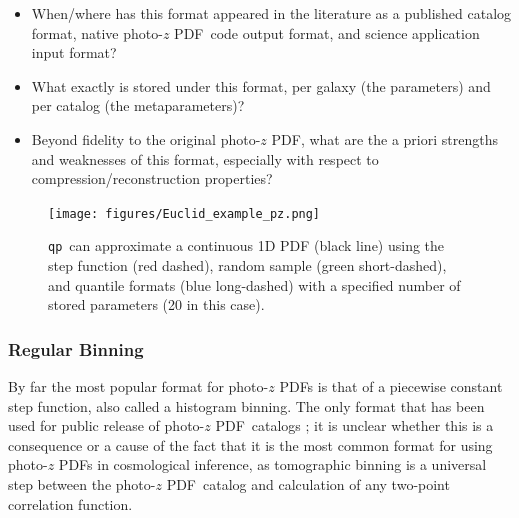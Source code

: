 \documentclass[\docopts]{\docclass}
\newcommand{\qp}{\texttt{qp}}
\newcommand{\pz}{photo-$z$ PDF}
\begin{document}
\begin{itemize}
  \item When/where has this format appeared in the literature as a published 
catalog format, native \pz\ code output format, and science application input 
format?
  \item What exactly is stored under this format, per galaxy (the parameters) 
and per catalog (the metaparameters)?
  \item Beyond fidelity to the original \pz, what are the a priori strengths 
and weaknesses of this format, especially with respect to 
compression/reconstruction properties?
\end{itemize}

\begin{figure}
  \texttt{[image: figures/Euclid\_example\_pz.png]}
  \caption{\qp\ can approximate a continuous 1D PDF (black line) using the step 
function (red dashed), random sample (green short-dashed), and quantile formats 
(blue long-dashed) with a specified number of stored parameters (20 in this 
case).
  \label{fig:qp}}
\end{figure}

\subsubsection{Regular Binning}
\label{sec:bins}

By far the most popular format for \pz s is that of a piecewise constant step 
function, also called a histogram binning.  The only format that has been used 
for public release of \pz\ catalogs \citep{tanaka_photometric_2017, 
sheldon_photometric_2012}; it is unclear whether this is a consequence or a 
cause of the fact that it is the most common format for using \pz s in 
cosmological inference, as tomographic binning is a universal step between the 
\pz\ catalog and calculation of any two-point correlation function.
\end{document}
